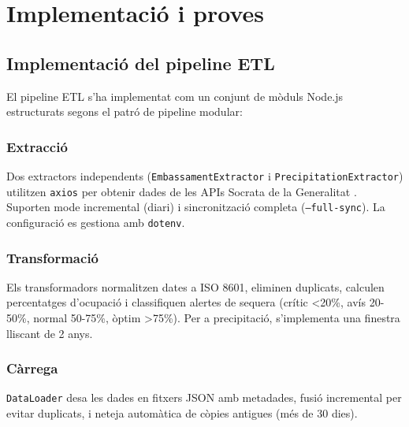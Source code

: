 

\chapter{Implementació i proves}
\label{Ch:Implementation}


\section{Implementació del pipeline ETL}

El pipeline ETL s'ha implementat com un conjunt de mòduls Node.js estructurats segons el patró de pipeline modular:

\subsection{Extracció}
Dos extractors independents (\texttt{EmbassamentExtractor} i \texttt{PrecipitationExtractor}) utilitzen \texttt{axios} per obtenir dades de les APIs Socrata de la Generalitat \cite{gencat_dades, socrata}. Suporten mode incremental (diari) i sincronització completa (\texttt{--full-sync}). La configuració es gestiona amb \texttt{dotenv}.

\subsection{Transformació}
Els transformadors normalitzen dates a ISO 8601, eliminen duplicats, calculen percentatges d'ocupació i classifiquen alertes de sequera (crític \textless20\%, avís 20-50\%, normal 50-75\%, òptim \textgreater75\%). Per a precipitació, s'implementa una finestra lliscant de 2 anys.

\subsection{Càrrega}
\texttt{DataLoader} desa les dades en fitxers JSON amb metadades, fusió incremental per evitar duplicats, i neteja automàtica de còpies antigues (més de 30 dies).



